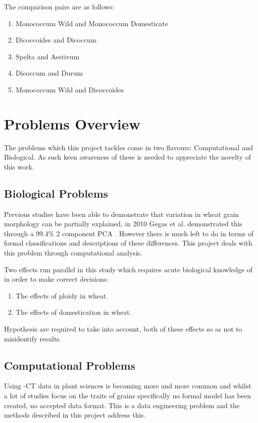 \documentclass[11pt]{report}
\begin{document}
The comparison pairs are as follows:

\begin{enumerate}
\item Monococcum Wild and Monococcum Domesticate
\item Dicoccoides and Dicoccum
\item Spelta and Aestivum
\item Dicoccum and Durum
\item Monococcum Wild and Dicoccoides
\end{enumerate}

\section{Problems Overview}
\label{sec-1-6}

The problems which this project tackles come in two flavours: Computational and Biological. As such keen awareness of these is needed to appreciate the novelty of this work.

\subsection{Biological Problems}
\label{sec-1-6-1}
Previous studies have been able to demonstrate that variation in wheat grain morphology can be partially explained, in 2010 Gegas et al. demonstrated this through a 99.4\% 2 component PCA \cite{Gegas2010}. However there is much left to do in terms of formal classifications and descriptions of these differences. This project deals with this problem through computational analysis.

Two effects run parallel in this study which requires acute biological knowledge of in order to make correct decisions:

\begin{enumerate}
\item The effects of ploidy in wheat.
\item The effects of domestication in wheat.
\end{enumerate}

Hypothesis are required to take into account, both of these effects so as not to misidentify results.

\subsection{Computational Problems}
\label{sec-1-6-2}
Using \textmu{}-CT data in plant sciences is becoming more and more common \cite{Tracy2017,Jhala2015,Hughes2017,Metzner2015} and whilst a lot of studies focus on the traits of grains specifically no formal model has been created, no accepted data format. This is a data engineering problem and the methods described in this project address this.
\end{document}
